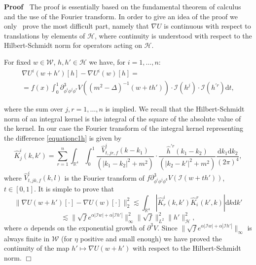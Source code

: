 \documentclass[a4paper,10pt]{article}
\newcommand{\mathd}{\mathrm{d}}
\newenvironment{proof}{\noindent\textbf{Proof\ }}{\hspace*{\fill}$\Box$\medskip}
\begin{document}
\begin{proof}
  The proof is essentially based on the fundamental theorem of calculus and
  the use of the Fourier transform. In order to give an idea of the proof we
  only \ prove the most difficult part, namely that $\nabla U$ is continuous
  with respect to translations by elements of $\mathcal{H}$, where continuity
  is understood with respect to the Hilbert-Schmidt norm for operators acting
  on $\mathcal{H}$.
  
  For fixed $w \in \mathcal{W}$, $h, h' \in \mathcal{H}$ we have, for $i = 1,
  \ldots, n$:
    \begin{multline}
      \nabla U^i (w + h') [h] - \nabla U^i (w) [h] =\\
      = f (x) \int_0^1 \partial_{\phi^i \phi^j \phi^r}^3 V ((m^2 - \Delta)^{-
      1} (w + t h')) \cdot \mathcal{I} (h^j) \cdot \mathcal{I} (h^{\prime r})
      \mathd t,
\label{equationc1h}    
\end{multline}
    
    
  where the sum over $j, r = 1, \ldots, n$ is implied. We recall that the
  Hilbert-Schmidt norm of an integral kernel is the integral of the square of
  the absolute value of the kernel. In our case the Fourier transform of the
  integral kernel representing the difference {\eqref{equationc1h}} is given
  by
  \[ \hat{K}^i_j (k, k') = \sum_{r = 1}^n \int_{\mathbb{R}^4} \int^1_0
     \frac{\hat{V}_{t, j r, f}^i (k - k_1)}{(| k_1 - k_2 |^2 + m^2)} \cdot
     \frac{\hat{h}^{\prime r} (k_1 - k_2)}{(| k_2 - k' |^2 + m^2)}
     \frac{\mathd k_1 \mathd k_2}{(2 \pi)^4}, \]
  where $\hat{V}_{t, j k, f}^i (k, l)$ is the Fourier transform of $f
  \partial_{\phi^i \phi^j \phi^k}^3 V (\mathcal{I} (w + t h'))$, $t \in [0,
  1]$. It is simple to prove that
  \[ \| \nabla U (w + h') [\cdot] - \nabla U (w) [\cdot] \|_2^2 \lesssim
     \int_{\mathbb{R}^4} | \hat{K}^i_r (k, k') \hat{K}^r_i (k', k) | \mathd k
     \mathd k'  \]
  \[ \lesssim \| \sqrt{f} e^{\alpha | \mathcal{I}w | + \alpha | \mathcal{I}h'
     |} \|^2_{\infty} \| \sqrt{f} \|^2_{L^2} \|h' \|^2_{\mathcal{H}}, \]
  where $\alpha$ depends on the exponential growth of $\partial^3 V$. Since
  $\| \sqrt{f} e^{\alpha | \mathcal{I}w | + \alpha | \mathcal{I}h' |}
  \|_{\infty}$ is always finite in $\mathcal{W}$ (for $\eta$ positive and
  small enough) we have proved the continuity of the map $h' \longmapsto
  \nabla U (w + h')$ with respect to the Hilbert-Schmidt norm.
\end{proof}
\end{document}
